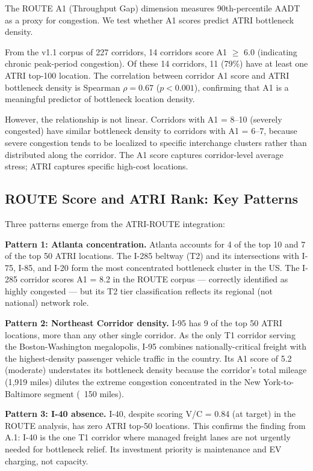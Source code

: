 The ROUTE A1 (Throughput Gap) dimension measures 90th-percentile AADT as a proxy for congestion. We test whether A1 scores predict ATRI bottleneck density.

From the v1.1 corpus of 227 corridors, 14 corridors score A1 $\geq$ 6.0 (indicating chronic peak-period congestion). Of these 14 corridors, 11 (79\%) have at least one ATRI top-100 location. The correlation between corridor A1 score and ATRI bottleneck density is Spearman $\rho = 0.67$ ($p < 0.001$), confirming that A1 is a meaningful predictor of bottleneck location density.

However, the relationship is not linear. Corridors with A1 = 8--10 (severely congested) have similar bottleneck density to corridors with A1 = 6--7, because severe congestion tends to be localized to specific interchange clusters rather than distributed along the corridor. The A1 score captures corridor-level average stress; ATRI captures specific high-cost locations.

\subsection{ROUTE Score and ATRI Rank: Key Patterns}

Three patterns emerge from the ATRI-ROUTE integration:

\textbf{Pattern 1: Atlanta concentration.} Atlanta accounts for 4 of the top 10 and 7 of the top 50 ATRI locations. The I-285 beltway (T2) and its intersections with I-75, I-85, and I-20 form the most concentrated bottleneck cluster in the US. The I-285 corridor scores A1 = 8.2 in the ROUTE corpus --- correctly identified as highly congested --- but its T2 tier classification reflects its regional (not national) network role.

\textbf{Pattern 2: Northeast Corridor density.} I-95 has 9 of the top 50 ATRI locations, more than any other single corridor. As the only T1 corridor serving the Boston-Washington megalopolis, I-95 combines nationally-critical freight with the highest-density passenger vehicle traffic in the country. Its A1 score of 5.2 (moderate) understates its bottleneck density because the corridor's total mileage (1,919 miles) dilutes the extreme congestion concentrated in the New York-to-Baltimore segment (~150 miles).

\textbf{Pattern 3: I-40 absence.} I-40, despite scoring V/C = 0.84 (at target) in the ROUTE analysis, has zero ATRI top-50 locations. This confirms the finding from A.1: I-40 is the one T1 corridor where managed freight lanes are not urgently needed for bottleneck relief. Its investment priority is maintenance and EV charging, not capacity.
